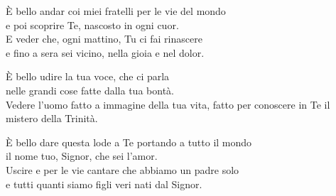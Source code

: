 
\strofa È bello andar coi miei fratelli per le vie del mondo\\
e poi scoprire Te, nascosto in ogni cuor.\\
E veder che, ogni mattino, Tu ci fai rinascere\\
e fino a sera sei vicino, nella gioia e nel dolor.

\spazio


\spazio

\strofa È bello udire la tua voce, che ci parla\\
nelle grandi cose fatte dalla tua bontà.\\
Vedere l'uomo fatto a immagine della tua vita,
fatto per conoscere in Te il mistero della Trinità.

\spazio


\spazio

È bello dare questa lode a Te portando a tutto il mondo\\
il nome tuo, Signor, che sei l'amor.\\
Uscire e per le vie cantare che abbiamo un padre solo\\
e tutti quanti siamo figli veri nati dal Signor.

\spazio

